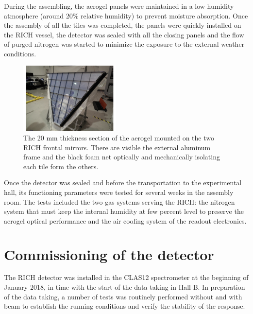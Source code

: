 \documentclass[5p,times,twocolumn]{elsarticle}
\begin{document}
During the assembling, the aerogel panels were maintained in a low humidity atmosphere (around 20\% relative humidity) to prevent moisture absorption.
Once the assembly of all the tiles was completed, the panels were quickly installed on the RICH vessel, the detector was sealed with all the closing panels and the flow of purged nitrogen was started to minimize the exposure to the external weather conditions.


\begin{figure}
\begin{center}
\includegraphics[width=0.45\textwidth]{aerogel_bottom.pdf}
\caption{The 20 mm thickness section of the aerogel mounted on the two RICH frontal mirrors. There are visible the external aluminum frame and the black foam net optically and mechanically isolating each tile form the others.}
\label{Fig:AeroB1}
\end{center}
\end{figure}

Once the detector was sealed and before the transportation to the experimental hall, its functioning parameters were tested for several
weeks in the assembly room. The tests included the two gas systems serving the RICH: the nitrogen system that must keep the internal
humidity at few percent level to preserve the aerogel optical performance and the air cooling system of the readout electronics.

\section{Commissioning of the detector}
\label{sec:Commissioning}

The RICH detector was installed in the CLAS12 spectrometer at the beginning of January 2018, in time with the start of the data taking in Hall B.
In preparation of the data taking, a number of tests was routinely performed without and with beam to establish the running conditions and verify the stability of the response.
\end{document}

